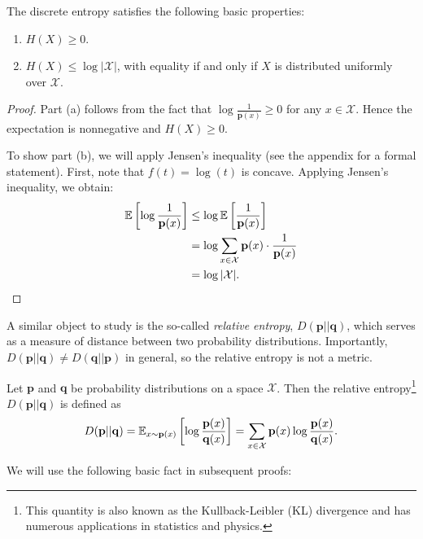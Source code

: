 \documentclass[13pt]{article}
\newcommand{\p}{\mathbf{p}}
\newcommand{\q}{\mathbf{q}}
\newcommand{\X}{\mathcal{X}}
\begin{document}
\begin{prop}
  The discrete entropy satisfies the following basic properties:
\begin{enumerate}[label=({\alph*})]
  \item $H(X) \geq 0$.
  \item $H(X) \leq \log |\mathcal{X}|$, with equality if and only if $X$ is distributed uniformly over $\mathcal{X}$.
\end{enumerate}
\end{prop}

\begin{proof}
  Part (a) follows from the fact that $\log \frac{1}{\p (x)} \geq 0$ for any $x \in \X$.  Hence the expectation is nonnegative and $H(X) \geq 0$.  
 
  To show part (b), we will apply Jensen's inequality (see the appendix for a formal statement).  First, note that $f(t) = \log (t)$ is concave.  Applying Jensen's inequality, we obtain:
  \begin{align*}
    \EE \left[ \log \frac{1}{\p (x)} \right] & \leq \log \EE \left[ \frac{1}{\p(x)} \right] \\
    &= \log \sum_{x \in \X} \p(x) \cdot \frac{1}{\p(x)} \\
    &= \log |\mathcal{X}|.
  \end{align*}
\end{proof}


A similar object to study is the so-called {\it relative entropy}, $D(\p || \q)$, which serves as a measure of distance between two probability distributions.  Importantly, $D(\p || \q) \neq D(\q || \p)$ in general, so the relative entropy is not a metric. \\

\begin{definition}
  Let $\p$ and $\q$ be probability distributions on a space $\mathcal{X}$.  Then the relative entropy\footnote{This quantity is also known as the Kullback-Leibler (KL) divergence and has numerous applications in statistics and physics.} $D(\p || \q)$ is defined as
  \begin{align*}
    D(\p || \q) = \EE_{x \sim \p(x)} \left[ \log \frac{\p(x)}{\q(x)} \right] = \sum_{x \in \mathcal{X}} \p(x) \log \frac{\p(x)}{\q(x)}.
  \end{align*}
\end{definition}

We will use the following basic fact in subsequent proofs: \\
\end{document}
